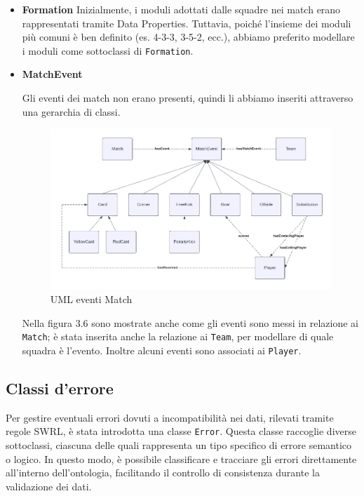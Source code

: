 \documentclass[11pt]{report} %
\begin{document}
\begin{itemize}[leftmargin=*]
    \newpage
    
    \item \textbf{Formation}
    Inizialmente, i moduli adottati dalle squadre nei match erano rappresentati tramite Data Properties. Tuttavia, poiché l’insieme dei moduli più comuni è ben definito (es. 4-3-3, 3-5-2, ecc.), abbiamo preferito modellare i moduli come sottoclassi di \texttt{Formation}.

    \item \textbf{MatchEvent}
    
    Gli eventi dei match non erano presenti, quindi li abbiamo inseriti attraverso una gerarchia di classi.

    \begin{figure} [h]
        \centering
        \includegraphics[width=\textwidth]{MATCHEVENT.png}
        \caption{UML eventi Match}
    \end{figure}

    Nella figura 3.6 sono mostrate anche come gli eventi sono messi in relazione ai \texttt{Match}; è stata inserita anche la relazione ai \texttt{Team}, per modellare di quale squadra è l'evento. Inoltre alcuni eventi sono associati ai \texttt{Player}. 

\end{itemize}

\newpage
\subsection{Classi d'errore}
Per gestire eventuali errori dovuti a incompatibilità nei dati, rilevati tramite regole SWRL, è stata introdotta una classe \texttt{Error}. Questa classe raccoglie diverse sottoclassi, ciascuna delle quali rappresenta un tipo specifico di errore semantico o logico. In questo modo, è possibile classificare e tracciare gli errori direttamente all’interno dell’ontologia, facilitando il controllo di consistenza durante la validazione dei dati.
\end{document}
